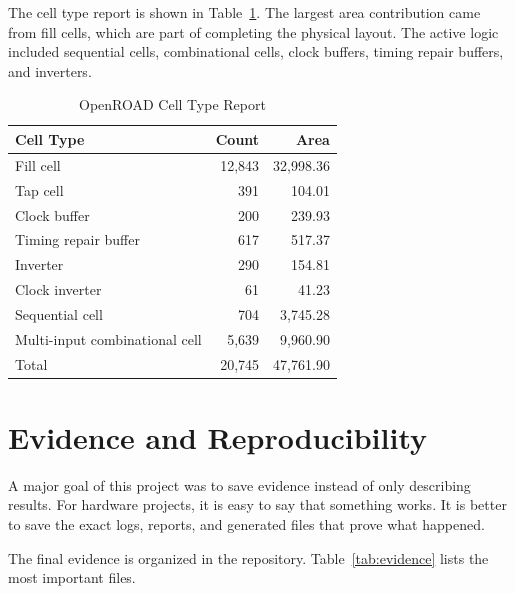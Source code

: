 \documentclass[conference]{IEEEtran}
\begin{document}
The cell type report is shown in Table~\ref{tab:cells}. The largest area contribution came from fill cells, which are part of completing the physical layout. The active logic included sequential cells, combinational cells, clock buffers, timing repair buffers, and inverters.

\begin{table}[h]
\centering
\caption{OpenROAD Cell Type Report}
\label{tab:cells}
\begin{tabular}{lrr}
\toprule
Cell Type & Count & Area \\
\midrule
Fill cell & 12,843 & 32,998.36 \\
Tap cell & 391 & 104.01 \\
Clock buffer & 200 & 239.93 \\
Timing repair buffer & 617 & 517.37 \\
Inverter & 290 & 154.81 \\
Clock inverter & 61 & 41.23 \\
Sequential cell & 704 & 3,745.28 \\
Multi-input combinational cell & 5,639 & 9,960.90 \\
Total & 20,745 & 47,761.90 \\
\bottomrule
\end{tabular}
\end{table}

\section{Evidence and Reproducibility}

A major goal of this project was to save evidence instead of only describing results. For hardware projects, it is easy to say that something works. It is better to save the exact logs, reports, and generated files that prove what happened.

The final evidence is organized in the repository. Table~\ref{tab:evidence} lists the most important files.
\end{document}
